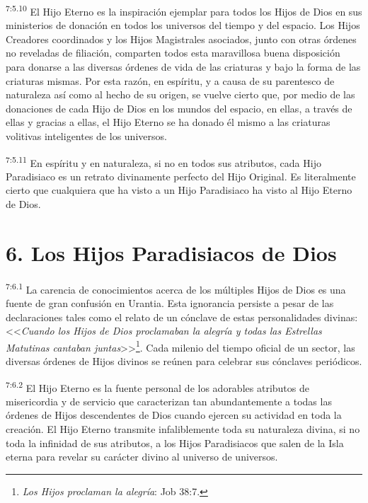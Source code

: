 \par
\textsuperscript{7:5.10} El Hijo Eterno es la inspiración ejemplar para todos los Hijos de Dios en sus ministerios de donación en todos los universos del tiempo y del espacio. Los Hijos Creadores coordinados y los Hijos Magistrales asociados, junto con otras órdenes no reveladas de filiación, comparten todos esta maravillosa buena disposición para donarse a las diversas órdenes de vida de las criaturas y bajo la forma de las criaturas mismas. Por esta razón, en espíritu, y a causa de su parentesco de naturaleza así como al hecho de su origen, se vuelve cierto que, por medio de las donaciones de cada Hijo de Dios en los mundos del espacio, en ellas, a través de ellas y gracias a ellas, el Hijo Eterno se ha donado él mismo a las criaturas volitivas inteligentes de los universos.

\par
\textsuperscript{7:5.11} En espíritu y en naturaleza, si no en todos sus atributos, cada Hijo Paradisiaco es un retrato divinamente perfecto del Hijo Original. Es literalmente cierto que cualquiera que ha visto a un Hijo Paradisiaco ha visto al Hijo Eterno de Dios.

\section*{6. Los Hijos Paradisiacos de Dios}
\par
\textsuperscript{7:6.1} La carencia de conocimientos acerca de los múltiples Hijos de Dios es una fuente de gran confusión en Urantia. Esta ignorancia persiste a pesar de las declaraciones tales como el relato de un cónclave de estas personalidades divinas: <<\textit{Cuando los Hijos de Dios proclamaban la alegría y todas las Estrellas Matutinas cantaban juntas}>>\footnote{\textit{Los Hijos proclaman la alegría}: Job 38:7.}. Cada milenio del tiempo oficial de un sector, las diversas órdenes de Hijos divinos se reúnen para celebrar sus cónclaves periódicos.

\par
\textsuperscript{7:6.2} El Hijo Eterno es la fuente personal de los adorables atributos de misericordia y de servicio que caracterizan tan abundantemente a todas las órdenes de Hijos descendentes de Dios cuando ejercen su actividad en toda la creación. El Hijo Eterno transmite infaliblemente toda su naturaleza divina, si no toda la infinidad de sus atributos, a los Hijos Paradisiacos que salen de la Isla eterna para revelar su carácter divino al universo de universos.

